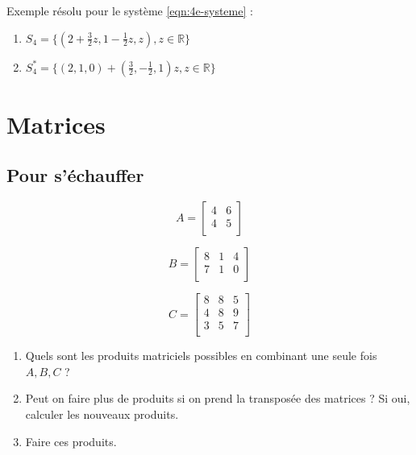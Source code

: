 \documentclass[a4paper]{article}\usepackage[]{graphicx}\usepackage[]{xcolor}
\newcommand{\R}{\mathbb{R}}
\begin{document}
Exemple résolu pour le système \ref{eqn:4e-systeme} :
\begin{enumerate}
    \item $S_4 = \{(2 + \frac{3}{2}z, 1 - \frac{1}{2} z, z), z\in\R\}$
    \item $S_4^* = \{(2, 1, 0) + (\frac{3}{2},  - \frac{1}{2} , 1)z, z\in\R\}$

\end{enumerate}

\section*{Matrices}

\subsection*{Pour s'échauffer}



\begin{minipage}{0.33\linewidth}
    \begin{equation*}
        A = \begin{bmatrix} 4 &6 \\4 &5 \\ \end{bmatrix}
    \end{equation*}
\end{minipage}
\begin{minipage}{0.33\linewidth}
    \begin{equation*}
        B = \begin{bmatrix} 8 &1 &4 \\7 &1 &0 \\ \end{bmatrix}
    \end{equation*}
\end{minipage}
\begin{minipage}{0.33\linewidth}
    \begin{equation*}
        C = \begin{bmatrix} 8 &8 &5 \\4 &8 &9 \\3 &5 &7 \\ \end{bmatrix}
    \end{equation*}
\end{minipage}

\begin{enumerate}
    \item Quels sont les produits matriciels possibles en combinant une seule 
    fois $A, B, C$ ? 
    \item Peut on faire plus de produits si on prend la 
    transposée des matrices ? Si oui, calculer les nouveaux produits.
    \item Faire ces produits.
\end{enumerate}
\end{document}
